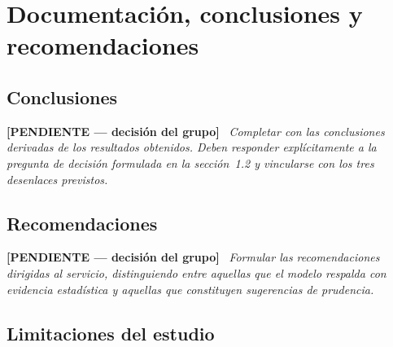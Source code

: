\documentclass{article}
\newenvironment{pendiente}
  {\par\medskip\noindent\begingroup\color{red!65!black}%
   \textbf{[PENDIENTE — decisión del grupo]}\ \itshape}
  {\endgroup\par\medskip}
\begin{document}
\section{Documentación, conclusiones y recomendaciones}

\subsection{Conclusiones}

\begin{pendiente}
Completar con las conclusiones derivadas de los resultados obtenidos. Deben
responder explícitamente a la pregunta de decisión formulada en la
sección~1.2 y vincularse con los tres desenlaces previstos.
\end{pendiente}

\subsection{Recomendaciones}

\begin{pendiente}
Formular las recomendaciones dirigidas al servicio, distinguiendo entre
aquellas que el modelo respalda con evidencia estadística y aquellas que
constituyen sugerencias de prudencia.
\end{pendiente}

\subsection{Limitaciones del estudio}
\end{document}
